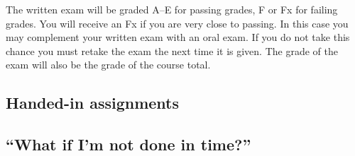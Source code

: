 \begin{frame}
  
\end{frame}

The written exam will be graded A--E for passing grades, F or Fx for failing 
grades.
You will receive an Fx if you are very close to passing.
In this case you may complement your written exam with an oral exam.
If you do not take this chance you must retake the exam the next 
time it is given.
The grade of the exam will also be the grade of the course total.

\subsection{Handed-in assignments}


\subsection{\enquote{What if I'm not done in time?}}%
\label{sec:late}



\printbibliography{}
